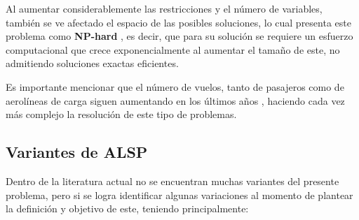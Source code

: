 \documentclass[letter, 10pt]{article}
\begin{document}
Al aumentar considerablemente las restricciones y el número de variables, también se ve afectado el espacio de las posibles soluciones, lo cual presenta este problema como \textbf{NP-hard} \cite{HybridAyudante}, es decir, que para su solución se requiere un esfuerzo computacional que crece exponencialmente al aumentar el tamaño de este, no admitiendo soluciones exactas eficientes.

Es importante mencionar que el número de vuelos, tanto de pasajeros como de aerolíneas de carga siguen aumentando en los últimos años \cite{HybridAyudante}, haciendo cada vez más complejo la resolución de este tipo de problemas.
\subsection{Variantes de ALSP}
Dentro de la literatura actual no se encuentran muchas variantes del presente problema, pero si se logra identificar algunas variaciones al momento de plantear la definición y objetivo de este, teniendo principalmente:
\end{document}
